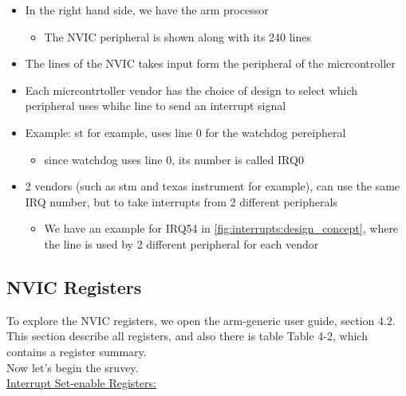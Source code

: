 \begin{itemize}

\item In the right hand side, we have the arm processor

	\begin{itemize}
	\item The NVIC peripheral is shown along with its 240 lines
	
 
	\end{itemize}

\item The lines of the NVIC takes input form the peripheral of the micrcontroller

\item Each micrcontrtoller vendor has the choice of design to select which peripheral uses whihc line to send an interrupt signal

\item Example: st for example, uses line 0 for the watchdog pereipheral

	\begin{itemize}
	\item since watchdog uses line 0, its number is called IRQ0
	\end{itemize}

\item 2 vendors (such as stm and texas instrument for example), can use the same IRQ number, but to take interrupts from 2 different peripherals

	\begin{itemize}
	\item We have an example for IRQ54 in \autoref{fig:interrupts:design_concept}, where the line is used by 2 different peripheral for each vendor
\end{itemize}	 

\end{itemize}

\newpage
\subsection{NVIC Registers}

To explore the NVIC registers, we open the arm-generic user guide, section 4.2. This section describe all registers, and also there is table Table 4-2, which contains a register summary.\\

Now let's begin the sruvey.\\

\underline{Interrupt Set-enable Registers:}

